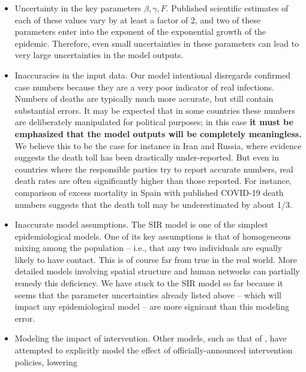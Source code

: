 \documentclass[english,12pt,letter]{article}
\newcommand{\ifr}{F}
\begin{document}
\begin{itemize}
    \item Uncertainty in the key parameters $\beta, \gamma, \ifr$.
            Published scientific estimates of each of these values vary by
            at least a factor of 2, and two of these parameters enter
            into the exponent of the exponential growth of the epidemic.
            Therefore, even small uncertainties in these parameters can lead to 
            very large uncertainties in the model outputs.
    \item Inaccuracies in the input data.  Our model intentional disregards
            confirmed case numbers because they are a very poor indicator of
            real infections.  Numbers of deaths are typically much more accurate,
            but still contain substantial errors.  It may be expected that in
            some countries these numbers are deliberately manipulated for
            political purposes; in this case {\bf it must be emphasized that
            the model outputs will be completely meaningless.}  We believe this
            to be the case for instance in Iran and Russia, where evidence suggests
            the death toll has been drastically under-reported.  But even
            in countries where the responsible parties try to report accurate
            numbers, real death rates are often significantly higher than those
            reported.  For instance, comparison of excess mortality in Spain
            with published COVID-19 death numbers suggests that the death toll
            may be underestimated by about 1/3.
    \item Inaccurate model assumptions.  The SIR model is one of the simplest
            epidemiological models.  One of its key assumptions is that
            of homogeneous mixing among the population -- i.e., that any two
            individuals are equally likely to have contact.  This is of course
            far from true in the real world.  More detailed models involving
            spatial structure and human networks can partially remedy this
            deficiency.  We have stuck to the SIR model so far because it seems
            that the parameter uncertainties already listed above -- which will
            impact any epidemiological model -- are more signicant than this
            modeling error.
    \item Modeling the impact of intervention.  Other models, such as that of
            \cite{flaxman2020report}, have attempted to explicitly model the
            effect of officially-announced intervention policies, lowering

\end{itemize}
\end{document}
